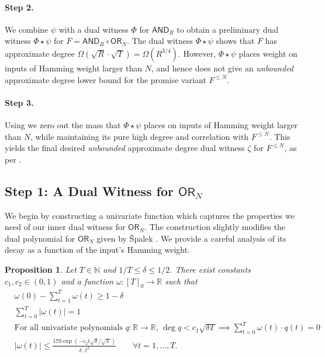 \documentclass[11pt, letterpaper, fleqn]{article}
\newtheorem{proposition}[theorem]{Proposition}
\theoremstyle{plain}
\newcommand{\R}{\mathbb{R}}
\newcommand{\OR}{\mathsf{ OR}}
\newcommand{\ls}{\star}
\newcommand{\N}{\mathbb{N}}
\newcommand{\AND}{\mathsf{AND}}
\begin{document}
\paragraph{Step 2.} We combine $\psi$ with a dual witness $\Phi$ for $\AND_R$ to obtain a preliminary dual witness $\Phi \ls \psi$ for $F = \AND_R \circ \OR_N$. The dual witness $\Phi \ls \psi$ shows that $F$ has approximate degree $\Omega(\sqrt{R} \cdot \sqrt{T}) = \Omega(R^{3/4})$. However, $\Phi \ls \psi$ places weight on inputs of Hamming weight larger than $N$, and hence does not give an \emph{unbounded} approximate degree lower bound for the promise variant $F^{\le N}$.


\paragraph{Step 3.} Using  we zero out the mass that $\Phi \ls \psi$ places on inputs of  Hamming weight larger than $N$, while maintaining its pure high degree and correlation with $F^{\le N}$. This yields the final desired \emph{unbounded} approximate degree dual witness $\zeta$ for $F^{\le N}$, as per .


\subsection{Step 1: A Dual Witness for \texorpdfstring{$\OR_N$}{OR}}


We begin by constructing a univariate function which captures the properties we need of our inner dual witness for $\OR_N$. The construction slightly modifies the dual polynomial for $\OR_N$ given by \v{S}palek \cite{spalek}. We provide a careful 
analysis of its decay as a function of the input's Hamming weight.

\begin{proposition} \label{prop:or-sym-dual}
Let $T \in \N$ and $1/T \le \delta \le 1/2$. There exist constants $c_1, c_2 \in (0, 1) $ and a function $\omega : [T]_0 \to \R$ such that
\begin{align}
&\omega(0) - \sum_{t = 1}^T \omega(t) \ge 1- \delta  \label{eqn:or-sym-corr}\\
&\sum_{t = 0}^T |\omega(t)| = 1 \\
& \text{For all univariate polynomials } q \colon \R \to \R\text{, } \deg q < c_1\sqrt{\delta T} \implies \sum_{t=0}^T \omega(t) \cdot q(t) = 0 \label{eqn:or-sym-phd}\\
& |\omega(t)| \le \frac{170 \exp(-c_2 t \sqrt{\delta} /  \sqrt{T})}{\delta \cdot t^2} \qquad \forall t = 1, \dots, T.\label{eqn:or-sym-decay}\end{align}
\end{proposition}
\end{document}
